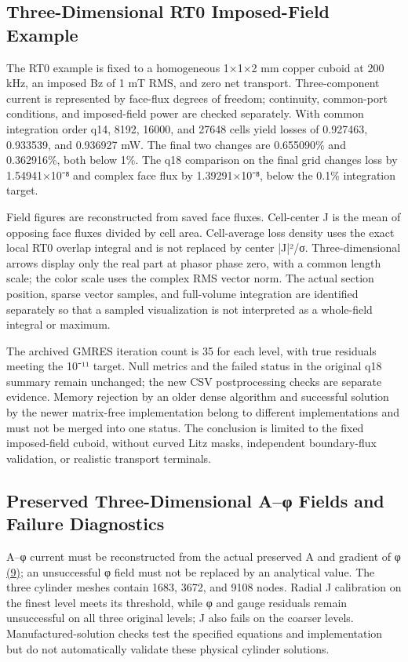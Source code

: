 \documentclass[11pt]{article}
\begin{document}
\subsection*{Three-Dimensional RT0 Imposed-Field Example}
\hypertarget{S2.rt0.heading}{}
The RT0 example is fixed to a homogeneous 1×1×2 mm copper cuboid at 200 kHz, an imposed Bz of 1 mT RMS, and zero net transport. Three-component current is represented by face-flux degrees of freedom; continuity, common-port conditions, and imposed-field power are checked separately. With common integration order q14, 8192, 16000, and 27648 cells yield losses of 0.927463, 0.933539, and 0.936927 mW. The final two changes are 0.655090\% and 0.362916\%, both below 1\%. The q18 comparison on the final grid changes loss by 1.54941×10⁻⁸ and complex face flux by 1.39291×10⁻⁸, below the 0.1\% integration target.


Field figures are reconstructed from saved face fluxes. Cell-center J is the mean of opposing face fluxes divided by cell area. Cell-average loss density uses the exact local RT0 overlap integral and is not replaced by center |J|²/σ. Three-dimensional arrows display only the real part at phasor phase zero, with a common length scale; the color scale uses the complex RMS vector norm. The actual section position, sparse vector samples, and full-volume integration are identified separately so that a sampled visualization is not interpreted as a whole-field integral or maximum.


The archived GMRES iteration count is 35 for each level, with true residuals meeting the 10⁻¹¹ target. Null metrics and the failed status in the original q18 summary remain unchanged; the new CSV postprocessing checks are separate evidence. Memory rejection by an older dense algorithm and successful solution by the newer matrix-free implementation belong to different implementations and must not be merged into one status. The conclusion is limited to the fixed imposed-field cuboid, without curved Litz masks, independent boundary-flux validation, or realistic transport terminals.


\subsection*{Preserved Three-Dimensional A–φ Fields and Failure Diagnostics}
\hypertarget{S2.aphi.heading}{}
A–φ current must be reconstructed from the actual preserved A and gradient of φ \href{paper_en_single.pdf#E07}{(9)}; an unsuccessful φ field must not be replaced by an analytical value. The three cylinder meshes contain 1683, 3672, and 9108 nodes. Radial J calibration on the finest level meets its threshold, while φ and gauge residuals remain unsuccessful on all three original levels; J also fails on the coarser levels. Manufactured-solution checks test the specified equations and implementation but do not automatically validate these physical cylinder solutions.
\end{document}
